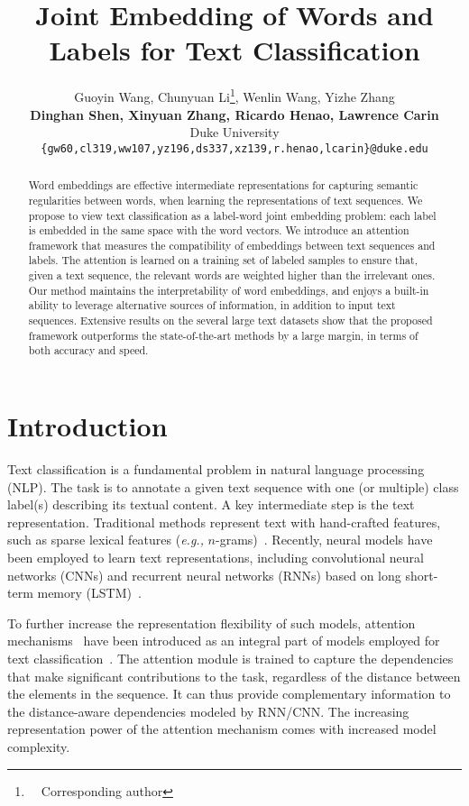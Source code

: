 \documentclass[11pt,a4paper]{article}
\title{Joint Embedding of Words and Labels for Text Classification}
\author{Guoyin Wang, Chunyuan Li\thanks{~~Corresponding author}, Wenlin Wang, Yizhe Zhang\\ 
	 \textbf{Dinghan Shen, Xinyuan Zhang, Ricardo Henao, Lawrence Carin}  \\
  Duke University \\
  {\tt \{gw60,cl319,ww107,yz196,ds337,xz139,r.henao,lcarin\}@duke.edu} \\}
\date{}
\newcommand{\eg}[0]{\emph{e.g., }}
\begin{document}
\maketitle
\begin{abstract}
Word embeddings are effective intermediate representations for capturing semantic regularities between words, when learning the representations of text sequences. We propose to view text classification as a label-word joint embedding problem: each label is embedded in the same space with the word vectors. We introduce an attention framework that measures the compatibility of embeddings between text sequences and labels. The attention is learned on a training set of labeled samples to ensure that, given a text sequence, the relevant words are weighted higher than the irrelevant ones. Our method maintains the interpretability of word embeddings, and enjoys a built-in ability to leverage alternative sources of information, in addition to input text sequences.  Extensive results on the several large text datasets show that the proposed framework outperforms the state-of-the-art methods by a large margin, in terms of both accuracy and speed.

\end{abstract}

\section{Introduction}
Text classification is a fundamental problem in natural language processing (NLP). The task is to annotate a given text sequence with one (or multiple) class label(s) describing its textual content. 
A key intermediate step is the text representation. Traditional methods represent text with hand-crafted features, such as sparse lexical features (\eg $n$-grams)~\cite{wang2012baselines}. Recently, neural models have been employed to learn text representations, including convolutional neural networks (CNNs) \cite{kalchbrenner2014convolutional,zhang2017deconvolutional,shen2017deconvolutional} and recurrent neural networks (RNNs) based on long short-term memory (LSTM)~\cite{hochreiter1997long,wang2018topic}.

To further increase the representation flexibility of such models, attention mechanisms~\cite{bahdanau2015neural} have been introduced as an integral part of models employed for text classification~\cite{yang2016hierarchical}. The attention module is trained to capture the dependencies that make significant contributions to the task, regardless of the distance between the elements in the sequence. It can thus provide complementary information to the distance-aware dependencies modeled by RNN/CNN. The increasing representation power of the attention mechanism comes with increased model complexity.
\end{document}
